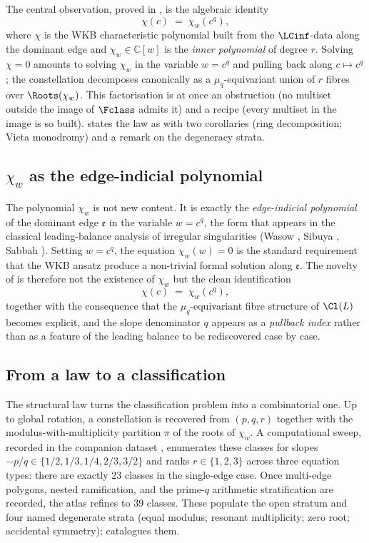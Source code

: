 The central observation, proved in , is the algebraic
identity
\[
   \chi(c) \;=\; \chi_w(c^q),
\]
where $\chi$ is the WKB characteristic polynomial built from the
$\LCinf$-data along the dominant edge and $\chi_w \in \mathbb{C}[w]$
is the \emph{inner polynomial} of degree $r$. Solving $\chi = 0$
amounts to solving $\chi_w$ in the variable $w = c^q$ and pulling
back along $c \mapsto c^q$; the constellation decomposes canonically
as a $\mu_q$-equivariant union of $r$ fibres over $\Roots(\chi_w)$.
This factorisation is at once an obstruction (no multiset outside the
image of $\Fclass$ admits it) and a recipe (every multiset in the
image is so built).  states the law as
 with two corollaries (ring decomposition; Vieta
monodromy) and a remark on the degeneracy strata.

\subsection{$\chi_w$ as the edge-indicial polynomial}
\label{ssec:intro-chi-w}

The polynomial $\chi_w$ is not new content. It is exactly the
\emph{edge-indicial polynomial} of the dominant edge $\mathfrak{e}$
in the variable $w = c^q$, the form that appears in the classical
leading-balance analysis of irregular singularities (Wasow
\cite{wasow}, Sibuya \cite{sibuya}, Sabbah
\cite{sabbah-isomon}). Setting $w = c^q$, the equation $\chi_w(w) = 0$
is the standard requirement that the WKB ansatz produce a
non-trivial formal solution along $\mathfrak{e}$. The novelty of
 is therefore not the existence of $\chi_w$ but the
clean identification
\[
   \chi(c) \;=\; \chi_w(c^q),
\]
together with the consequence that the $\mu_q$-equivariant fibre
structure of $\Cl(L)$ becomes explicit, and the slope denominator $q$
appears as a \emph{pullback index} rather than as a feature of the
leading balance to be rediscovered case by case.

\subsection{From a law to a classification}
\label{ssec:intro-classification}

The structural law turns the classification problem into a
combinatorial one. Up to global rotation, a constellation is recovered
from $(p, q, r)$ together with the modulus-with-multiplicity partition
$\pi$ of the roots of $\chi_w$. A computational sweep, recorded in the
companion dataset \cite{wkb_dataset_v1}, enumerates these classes for
slopes $-p/q \in \{1/2, 1/3, 1/4, 2/3, 3/2\}$ and ranks $r \in
\{1, 2, 3\}$ across three equation types: there are exactly $23$
classes in the single-edge case. Once multi-edge polygons, nested
ramification, and the prime-$q$ arithmetic stratification are recorded,
the atlas refines to $39$ classes. These populate the open stratum
and four named degenerate strata (equal modulus; resonant multiplicity;
zero root; accidental symmetry);  catalogues them.

